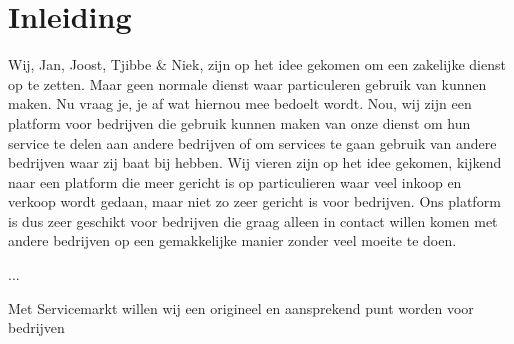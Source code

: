 \chapter{Inleiding}
Wij, Jan, Joost, Tjibbe & Niek, zijn op het idee gekomen om een zakelijke dienst op te zetten. Maar geen normale dienst waar particuleren gebruik van kunnen maken.
Nu vraag je, je af wat hiernou mee bedoelt wordt. Nou, wij zijn een platform voor bedrijven die gebruik kunnen maken van onze dienst om hun service te delen aan andere bedrijven of om services te gaan gebruik van andere bedrijven waar zij baat bij hebben.
Wij vieren zijn op het idee gekomen, kijkend naar een platform die meer gericht is op particulieren waar veel inkoop en verkoop wordt gedaan, maar niet zo zeer gericht is voor bedrijven.
Ons platform is dus zeer geschikt voor bedrijven die graag alleen in contact willen komen met andere bedrijven op een gemakkelijke manier zonder veel moeite te doen.

...




Met Servicemarkt willen wij een origineel en aansprekend punt worden voor bedrijven
